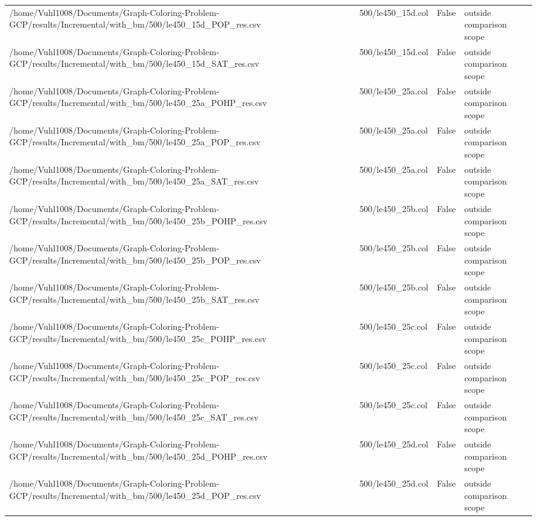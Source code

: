 \begin{table}[htbp]
\begin{tabular}{llll}
/home/Vuhl1008/Documents/Graph-Coloring-Problem-GCP/results/Incremental/with\_bm/500/le450\_15d\_POP\_res.csv & 500/le450\_15d.col & False & outside comparison scope \\
/home/Vuhl1008/Documents/Graph-Coloring-Problem-GCP/results/Incremental/with\_bm/500/le450\_15d\_SAT\_res.csv & 500/le450\_15d.col & False & outside comparison scope \\
/home/Vuhl1008/Documents/Graph-Coloring-Problem-GCP/results/Incremental/with\_bm/500/le450\_25a\_POHP\_res.csv & 500/le450\_25a.col & False & outside comparison scope \\
/home/Vuhl1008/Documents/Graph-Coloring-Problem-GCP/results/Incremental/with\_bm/500/le450\_25a\_POP\_res.csv & 500/le450\_25a.col & False & outside comparison scope \\
/home/Vuhl1008/Documents/Graph-Coloring-Problem-GCP/results/Incremental/with\_bm/500/le450\_25a\_SAT\_res.csv & 500/le450\_25a.col & False & outside comparison scope \\
/home/Vuhl1008/Documents/Graph-Coloring-Problem-GCP/results/Incremental/with\_bm/500/le450\_25b\_POHP\_res.csv & 500/le450\_25b.col & False & outside comparison scope \\
/home/Vuhl1008/Documents/Graph-Coloring-Problem-GCP/results/Incremental/with\_bm/500/le450\_25b\_POP\_res.csv & 500/le450\_25b.col & False & outside comparison scope \\
/home/Vuhl1008/Documents/Graph-Coloring-Problem-GCP/results/Incremental/with\_bm/500/le450\_25b\_SAT\_res.csv & 500/le450\_25b.col & False & outside comparison scope \\
/home/Vuhl1008/Documents/Graph-Coloring-Problem-GCP/results/Incremental/with\_bm/500/le450\_25c\_POHP\_res.csv & 500/le450\_25c.col & False & outside comparison scope \\
/home/Vuhl1008/Documents/Graph-Coloring-Problem-GCP/results/Incremental/with\_bm/500/le450\_25c\_POP\_res.csv & 500/le450\_25c.col & False & outside comparison scope \\
/home/Vuhl1008/Documents/Graph-Coloring-Problem-GCP/results/Incremental/with\_bm/500/le450\_25c\_SAT\_res.csv & 500/le450\_25c.col & False & outside comparison scope \\
/home/Vuhl1008/Documents/Graph-Coloring-Problem-GCP/results/Incremental/with\_bm/500/le450\_25d\_POHP\_res.csv & 500/le450\_25d.col & False & outside comparison scope \\
/home/Vuhl1008/Documents/Graph-Coloring-Problem-GCP/results/Incremental/with\_bm/500/le450\_25d\_POP\_res.csv & 500/le450\_25d.col & False & outside comparison scope \\

\end{tabular}
\end{table}
